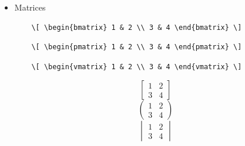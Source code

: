 \begin{itemize}
    \item Matrices   

        \begin{minipage}{3.5in}
\begin{verbatim}
    \[ \begin{bmatrix} 1 & 2 \\ 3 & 4 \end{bmatrix} \]
\end{verbatim}
\begin{verbatim}
    \[ \begin{pmatrix} 1 & 2 \\ 3 & 4 \end{pmatrix} \]
\end{verbatim}
\begin{verbatim}
    \[ \begin{vmatrix} 1 & 2 \\ 3 & 4 \end{vmatrix} \]
\end{verbatim}
        \end{minipage}
        \begin{minipage}{3in}
            \[ \begin{bmatrix} 1 & 2 \\ 3 & 4 \end{bmatrix} \]
            \[ \begin{pmatrix} 1 & 2 \\ 3 & 4 \end{pmatrix} \]
            \[ \begin{vmatrix} 1 & 2 \\ 3 & 4 \end{vmatrix} \]
        \end{minipage}


\end{itemize}
